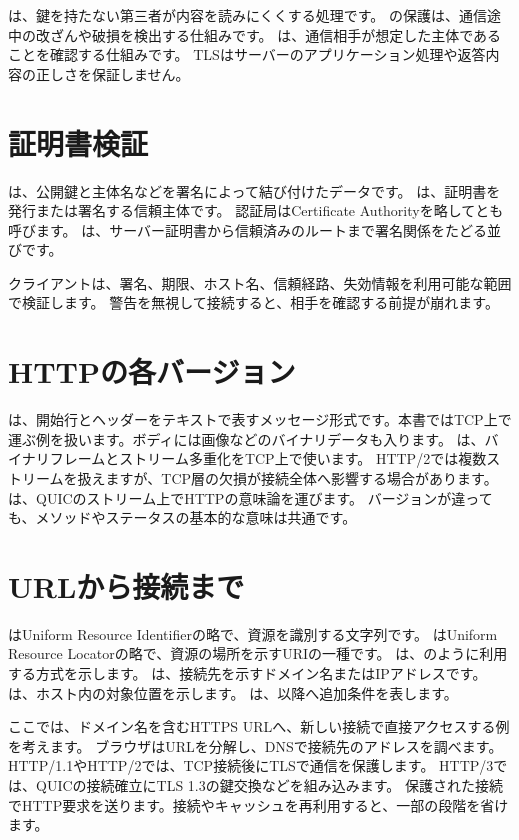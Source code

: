 は、鍵を持たない第三者が内容を読みにくくする処理です。
の保護は、通信途中の改ざんや破損を検出する仕組みです。
は、通信相手が想定した主体であることを確認する仕組みです。
TLSはサーバーのアプリケーション処理や返答内容の正しさを保証しません。

\section{証明書検証}

は、公開鍵と主体名などを署名によって結び付けたデータです。
は、証明書を発行または署名する信頼主体です。
認証局はCertificate Authorityを略してとも呼びます。
は、サーバー証明書から信頼済みのルートまで署名関係をたどる並びです。

クライアントは、署名、期限、ホスト名、信頼経路、失効情報を利用可能な範囲で検証します。
警告を無視して接続すると、相手を確認する前提が崩れます。

\section{HTTPの各バージョン}

は、開始行とヘッダーをテキストで表すメッセージ形式です。本書ではTCP上で運ぶ例を扱います。ボディには画像などのバイナリデータも入ります。
は、バイナリフレームとストリーム多重化をTCP上で使います。
HTTP/2では複数ストリームを扱えますが、TCP層の欠損が接続全体へ影響する場合があります。
は、QUICのストリーム上でHTTPの意味論を運びます。
バージョンが違っても、メソッドやステータスの基本的な意味は共通です。

\section{URLから接続まで}

はUniform Resource Identifierの略で、資源を識別する文字列です。
はUniform Resource Locatorの略で、資源の場所を示すURIの一種です。
は、のように利用する方式を示します。
は、接続先を示すドメイン名またはIPアドレスです。
は、ホスト内の対象位置を示します。
は、以降へ追加条件を表します。

ここでは、ドメイン名を含むHTTPS URLへ、新しい接続で直接アクセスする例を考えます。
ブラウザはURLを分解し、DNSで接続先のアドレスを調べます。
HTTP/1.1やHTTP/2では、TCP接続後にTLSで通信を保護します。
HTTP/3では、QUICの接続確立にTLS 1.3の鍵交換などを組み込みます。
保護された接続でHTTP要求を送ります。接続やキャッシュを再利用すると、一部の段階を省けます。

